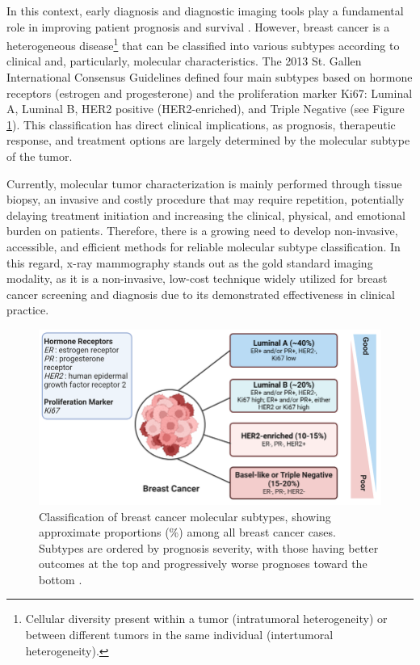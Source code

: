 \documentclass[a4paper,10pt]{book}
\begin{document}
In this context, early diagnosis and diagnostic imaging tools play a fundamental role in improving patient prognosis and survival \cite{wang_early_2017}. However, breast cancer is a heterogeneous disease\footnote{Cellular diversity present within a tumor (intratumoral heterogeneity) or between different tumors in the same individual (intertumoral heterogeneity).} that can be classified into various subtypes according to clinical and, particularly, molecular characteristics. The 2013 St. Gallen International Consensus Guidelines \cite{goldhirsch_personalizing_2013} defined four main subtypes based on hormone receptors (estrogen and progesterone) and the proliferation marker Ki67: Luminal A, Luminal B, HER2 positive (HER2-enriched), and Triple Negative (see Figure \ref{fig:subtypes}). This classification has direct clinical implications, as prognosis, therapeutic response, and treatment options are largely determined by the molecular subtype of the tumor.

Currently, molecular tumor characterization is mainly performed through tissue biopsy, an invasive and costly procedure that may require repetition, potentially delaying treatment initiation and increasing the clinical, physical, and emotional burden on patients. Therefore, there is a growing need to develop non-invasive, accessible, and efficient methods for reliable molecular subtype classification. In this regard, x-ray mammography stands out as the gold standard imaging modality, as it is a non-invasive, low-cost technique widely utilized for breast cancer screening and diagnosis due to its demonstrated effectiveness in clinical practice.

\begin{figure}
	\centering
	\includegraphics[width=0.8\linewidth]{reports/assets/subtypes.png}
	\caption{Classification of breast cancer molecular subtypes, showing approximate proportions (\%) among all breast cancer cases. Subtypes are ordered by prognosis severity, with those having better outcomes at the top and progressively worse prognoses toward the bottom \cite{harnessing_2024}.}
	\label{fig:subtypes}
\end{figure}
\end{document}
